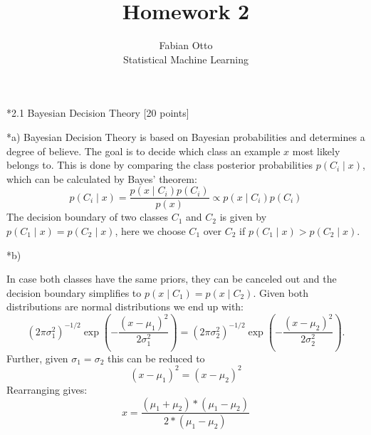 \documentclass[12pt]{article}
\begin{document}
 
 
 
\title{Homework 2}%
\author{Fabian Otto\\ %
Statistical Machine Learning} %
 
\maketitle
\begin{section}*{2.1 Bayesian Decision Theory [20 points]}
	\begin{subsection}*{a)} 
		Bayesian Decision Theory is based on Bayesian probabilities and determines a degree of believe. 
		The goal is to decide which class an example $x$ most likely belongs to.
		This is done by comparing the class posterior probabilities $p(C_i\mid x)$, which can be calculated by Bayes' theorem:
		\[
		p(C_i \mid x)=\frac{p(x\mid C_i)p(C_i)}{p(x)} \propto p(x\mid C_i)p(C_i)
		\]
		The decision boundary of two classes $C_1$ and $C_2$ is given by $p(C_1\mid x)=p(C_2\mid x)$, here we choose $C_1$ over $C_2$ if $p(C_1\mid x)>p(C_2\mid x)$.
	\end{subsection}
	\begin{subsection}*{b)}
		
		In case both classes have the same priors, they can be canceled out and the decision boundary simplifies to $p(x\mid C_1)=p(x\mid C_2)$.
		Given both distributions are normal distributions we end up with: 
		\begin{equation*}
		(2\pi\sigma_1^2)^{-1/2}\exp(-\frac{(x-\mu_1)^2}{2\sigma_1^2})= (2\pi\sigma_2^2)^{-1/2}\exp(-\frac{(x-\mu_2)^2}{2\sigma_2^2}).
		\end{equation*}
		Further, given $\sigma_1=\sigma_2$ this can be reduced to 
		\[
		(x-\mu_1)^2=(x-\mu_2)^2
		\] 
		Rearranging gives: 
		\[
		x = \frac{(\mu_1 + \mu_2)*(\mu_1 - \mu_2)}{2*(\mu_1 - \mu_2)}
		\] 
		

\end{subsection}
\end{section}
\end{document}
